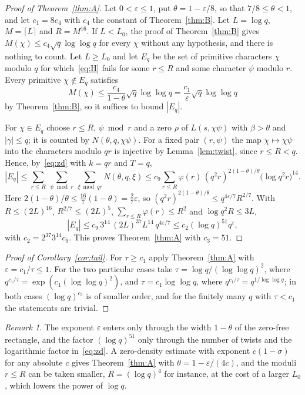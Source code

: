 \documentclass[11pt,a4paper,reqno]{amsart}
\theoremstyle{remark}
\newtheorem{remark}[theorem]{Remark}
\numberwithin{equation}{section}
\newcommand{\eps}{\varepsilon}
\begin{document}
\begin{proof}[Proof of Theorem~\ref{thm:A}]
Let $0<\eps\le1$, put $\theta=1-\eps/8$, so that $7/8\le\theta<1$, and let $c_1=8c_4$ with $c_4$ the constant of Theorem~\ref{thm:B}. Let $L=\log q$, $M=\lceil L\rceil$ and $R=M^{16}$. If $L<L_0$, the proof of Theorem~\ref{thm:B} gives $M(\chi)\le c_4\sqrt q\log\log q$ for every $\chi$ without any hypothesis, and there is nothing to count. Let $L\ge L_0$ and let $E_q$ be the set of primitive characters $\chi$ modulo $q$ for which~\eqref{eq:H} fails for some $r\le R$ and some character $\psi$ modulo $r$. Every primitive $\chi\notin E_q$ satisfies
\[
  M(\chi)\le\frac{c_4}{1-\theta}\sqrt q\log\log q=\frac{c_1}{\eps}\sqrt q\log\log q
\]
by Theorem~\ref{thm:B}, so it suffices to bound $|E_q|$.

For $\chi\in E_q$ choose $r\le R$, $\psi\bmod r$ and a zero $\rho$ of $L(s,\chi\psi)$ with $\beta>\theta$ and $|\gamma|\le q$; it is counted by $N(\theta,q,\chi\psi)$. For a fixed pair $(r,\psi)$ the map $\chi\mapsto\chi\psi$ into the characters modulo $qr$ is injective by Lemma~\ref{lem:twist}, since $r\le R<q$. Hence, by~\eqref{eq:zd} with $k=qr$ and $T=q$,
\[
  |E_q|\le\sum_{r\le R}\ \sum_{\psi\bmod r}\ \sum_{\xi\bmod qr}N(\theta,q,\xi)
  \le c_9\sum_{r\le R}\varphi(r)\,(q^2r)^{2(1-\theta)/\theta}\bigl(\log q^2r\bigr)^{14}.
\]
Here $2(1-\theta)/\theta\le\frac{16}7(1-\theta)=\frac27\eps$, so $(q^2r)^{2(1-\theta)/\theta}\le q^{4\eps/7}R^{2/7}$. With $R\le(2L)^{16}$, $R^{2/7}\le(2L)^5$, $\sum_{r\le R}\varphi(r)\le R^2$ and $\log q^2R\le3L$,
\[
  |E_q|\le c_9\,3^{14}\,(2L)^{37}L^{14}\,q^{4\eps/7}\le c_2(\log q)^{51}q^{\eps},
\]
with $c_2=2^{37}3^{14}c_9$. This proves Theorem~\ref{thm:A} with $c_3=51$.
\end{proof}

\begin{proof}[Proof of Corollary~\ref{cor:tail}]
For $\tau\ge c_1$ apply Theorem~\ref{thm:A} with $\eps=c_1/\tau\le1$. For the two particular cases take $\tau=\log q/(\log\log q)^2$, where $q^{c_1/\tau}=\exp(c_1(\log\log q)^2)$, and $\tau=c_1\log\log q$, where $q^{c_1/\tau}=q^{1/\log\log q}$; in both cases $(\log q)^{c_3}$ is of smaller order, and for the finitely many $q$ with $\tau<c_1$ the statements are trivial.
\end{proof}

\begin{remark}
The exponent $\eps$ enters only through the width $1-\theta$ of the zero-free rectangle, and the factor $(\log q)^{51}$ only through the number of twists and the logarithmic factor in~\eqref{eq:zd}. A zero-density estimate with exponent $c(1-\sigma)$ for any absolute $c$ gives Theorem~\ref{thm:A} with $\theta=1-\eps/(4c)$, and the moduli $r\le R$ can be taken smaller, $R=(\log q)^{4}$ for instance, at the cost of a larger $L_0$, which lowers the power of $\log q$.
\end{remark}
\end{document}
